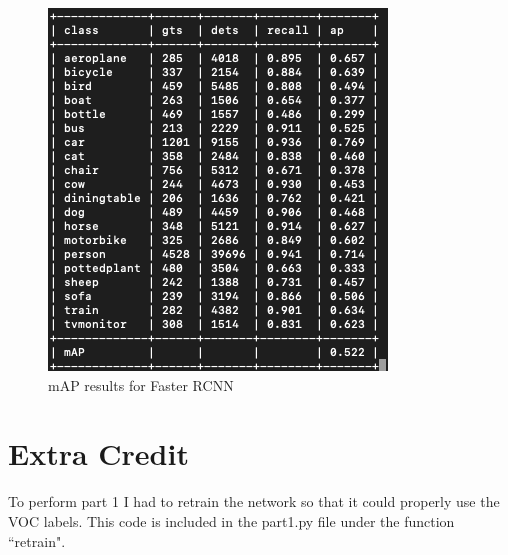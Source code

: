\documentclass{article}
\begin{document}
\begin{figure}
\centering
\includegraphics[width=\textwidth]{faster_rcnn_r50_fpn_1x_voc07.png}
\caption{mAP results for Faster RCNN}
\label{fig:faster_rcnn}
\end{figure}

\section{Extra Credit}
To perform part 1 I had to retrain the network so that it could properly use the
VOC labels. This code is included in the part1.py file under the function
``retrain".
\end{document}
